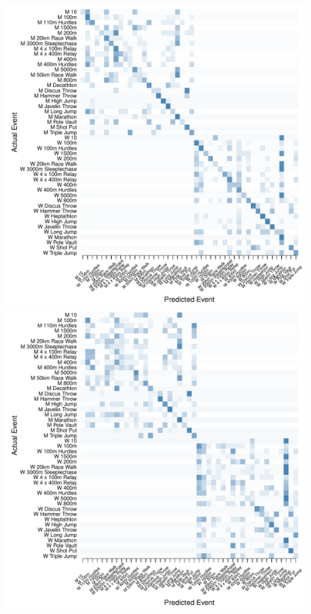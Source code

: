 \begin{figure}
\begin{center}
\begin{minipage}{0.20\textwidth}
\begin{center}
    \end{center}
  \end{minipage}
    \hspace{0.05\textwidth}
    \begin{minipage}{0.20\textwidth}
    \begin{center}
      \includegraphics[scale=0.20]{../graphics/athletesANN-trn.pdf}
    \end{center}
  \end{minipage}
  \hspace{0.05\textwidth}
  \begin{minipage}{0.20\textwidth}
    \begin{center}
      \includegraphics[scale=0.20]{../graphics/athletesANN-tst.pdf}

\end{center}
\end{minipage}
\end{center}
\end{figure}
